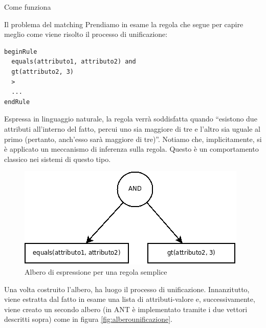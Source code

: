 \begin{chapter}{Come funziona}
\begin{section}{Il problema del matching}
\noindent Prendiamo in esame la regola che segue per capire meglio come viene
risolto il processo di unificazione:

\begin{verbatim}
beginRule
  equals(attributo1, attributo2) and
  gt(attributo2, 3)
  >
  ...
endRule
\end{verbatim}

Espressa in linguaggio naturale, la regola verr\`a soddisfatta quando ``esistono due
attributi all'interno del fatto, percui uno sia maggiore di tre e l'altro sia uguale
al primo (pertanto, anch'esso sar\`a maggiore di tre)''. Notiamo che, implicitamente,
si \`e applicato un meccanismo di inferenza sulla regola. Questo \`e un comportamento
classico nei sistemi di questo tipo.

\begin{figure}[!htb]
	\centering
	\includegraphics[scale=.45]{img/alberoregolasemplice.png}
	\caption{Albero di espressione per una regola semplice}
	\label{fig:alberoregolasemplice}
\end{figure}

Una volta costruito l'albero, ha luogo il processo di unificazione. Innanzitutto,
viene estratta dal fatto in esame una lista di attributi-valore e, successivamente,
viene creato un secondo albero (in ANT \`e implementato tramite i due vettori descritti
sopra) come in figura \ref{fig:alberounificazione}.


\end{section}
\end{chapter}
